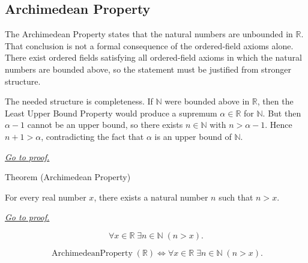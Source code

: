 
\subsection*{Archimedean Property}

\begin{remark*}
The Archimedean Property states that the natural numbers are unbounded in
$\mathbb{R}$. That conclusion is not a formal consequence of the ordered-field
axioms alone. There exist ordered fields satisfying all ordered-field axioms in
which the natural numbers are bounded above, so the statement must be justified
from stronger structure.

The needed structure is completeness. If $\mathbb{N}$ were bounded above in
$\mathbb{R}$, then the Least Upper Bound Property would produce a supremum
$\alpha \in \mathbb{R}$ for $\mathbb{N}$. But then $\alpha - 1$ cannot be an
upper bound, so there exists $n \in \mathbb{N}$ with $n > \alpha - 1$. Hence
$n+1 > \alpha$, contradicting the fact that $\alpha$ is an upper bound of
$\mathbb{N}$.

\smallskip
\noindent
\hyperref[prf:archimedean-property]{\textit{Go to proof.}}
\end{remark*}




\begin{theorembox}{Theorem (Archimedean Property)}
\begin{theorem}
\label{thm:archimedean-property}
For every real number $x$, there exists a natural number $n$ such that $n>x$.

\smallskip
\noindent
\hyperref[prf:archimedean-property]{\textit{Go to proof.}}
\end{theorem}
\end{theorembox}

\begin{remark*}
\[
\forall x\in\mathbb{R}\;\exists n\in\mathbb{N}\;(n>x).
\]
\end{remark*}

\begin{remark*}
\[
\operatorname{ArchimedeanProperty}(\mathbb{R})\Longleftrightarrow
\forall x\in\mathbb{R}\;\exists n\in\mathbb{N}\;(n>x).
\]
\end{remark*}

